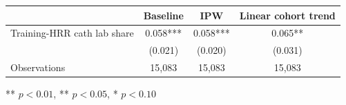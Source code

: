 \begin{threeparttable}
\begin{tabular}{lccc}
\toprule
 & Baseline & IPW & Linear cohort trend \\
\midrule
Training-HRR cath lab share & 0.058*** & 0.058*** & 0.065** \\
 & (0.021) & (0.020) & (0.031) \\
\midrule
Observations & 15,083 & 15,083 & 15,083 \\
\bottomrule
\end{tabular}
\begin{tablenotes}[flushleft]
\footnotesize
\item *** $p < 0.01$, ** $p < 0.05$, * $p < 0.10$
\end{tablenotes}
\end{threeparttable}